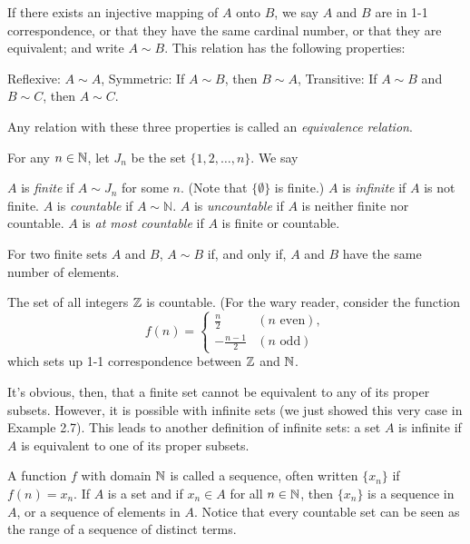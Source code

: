 \documentclass{article}
\begin{document}
\begin{definition}
    If there exists an injective mapping of $A$ onto $B$, we say $A$ and $B$ are in 1-1 correspondence, or that they have the same cardinal number, or that they are equivalent; and write $A \sim B$. This relation has the following properties:
    \begin{enumerate}
        \ii Reflexive: $A\sim A$,
        \ii Symmetric: If $A\sim B$, then $B\sim A$,
        \ii Transitive: If $A\sim B$ and $B\sim C$, then $A\sim C$.
    \end{enumerate}
    Any relation with these three properties is called an \textit{equivalence relation}.
\end{definition}
\begin{definition}
    For any $n\in \mathbb N$, let $J_{n}$ be the set $\{1,2,\dotsc,n\}$. We say
    \begin{enumerate}
        \ii $A$ is \textit{finite} if $A\sim J_{n}$ for some $n$. (Note that $\{\emptyset\}$ is finite.)
        \ii $A$ is \textit{infinite} if $A$ is not finite.
        \ii $A$ is \textit{countable} if $A\sim \mathbb{N}$.
        \ii $A$ is \textit{uncountable} if $A$ is neither finite nor countable.
        \ii $A$ is \textit{at most countable} if $A$ is finite or countable.
    \end{enumerate}
    For two finite sets $A$ and $B$, $A\sim B$ if, and only if, $A$ and $B$ have the same number of elements.
\end{definition}
\begin{example}
    The set of all integers $\mathbb Z$ is countable. (For the wary reader, consider the function \[f(n)=\begin{cases}
        \frac{n}{2} & (n\textrm{ even}),\\
        -\frac{n-1}{2} & (n\textrm{ odd})
    \end{cases}\]which sets up 1-1 correspondence between $\mathbb Z$ and $\mathbb N$.
\end{example}   
\begin{remark}
    It's obvious, then, that a finite set cannot be equivalent to any of its proper subsets. However, it is possible with infinite sets (we just showed this very case in Example 2.7). This leads to another definition of infinite sets: a set $A$ is infinite if $A$ is equivalent to one of its proper subsets.
\end{remark}
\begin{definition}
    A function $f$ with domain $\mathbb N$ is called a sequence, often written $\{x_{n}\}$ if $f(n)=x_{n}$. If $A$ is a set and if $x_{n}\in A$ for all $n\in\mathbb N$, then $\{x_{n}\}$ is a sequence in $A$, or a sequence of elements in $A$. Notice that every countable set can be seen as the range of a sequence of distinct terms.
\end{definition}    
\end{document}
